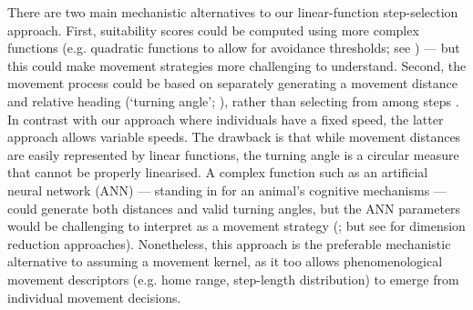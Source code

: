 There are two main mechanistic alternatives to our linear-function step-selection approach.
First, suitability scores could be computed using more complex functions (e.g. quadratic functions to allow for avoidance thresholds; see \cite{white2018}) --- but this could make movement strategies more challenging to understand.
Second, the movement process could be based on separately generating a movement distance and relative heading (`turning angle'; \cite{calenge2009}), rather than selecting from among steps \parencite{mueller2011}.
In contrast with our approach where individuals have a fixed speed, the latter approach allows variable speeds.
The drawback is that while movement distances are easily represented by linear functions, the turning angle is a circular measure that cannot be properly linearised.
A complex function such as an artificial neural network (ANN) --- standing in for an animal's cognitive mechanisms --- could generate both distances and valid turning angles, but the ANN parameters would be challenging to interpret as a movement strategy (\cite{mueller2011}; but see \cite{bastille-rousseau2019} for dimension reduction approaches).
Nonetheless, this approach is the preferable mechanistic alternative to assuming a movement kernel, as it too allows phenomenological movement descriptors (e.g. home range, step-length distribution) to emerge from individual movement decisions.

